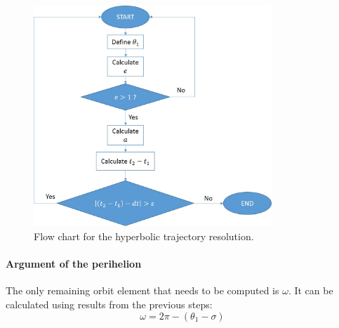 \begin{itemize}
\begin{figure}[H]
\centering
\includegraphics[width=0.8\textwidth]{././images/flowcharthyp.jpg} 
\caption{Flow chart for the hyperbolic trajectory resolution.}
\label{Flowhyp}
\end{figure}
\end{itemize}
\paragraph{Argument of the perihelion} 
The only remaining orbit element that needs to be computed is $\omega$. It can be calculated using results from the previous steps:
\begin{equation}
\omega = 2\pi - (\theta _1 - \sigma )
\end{equation}


